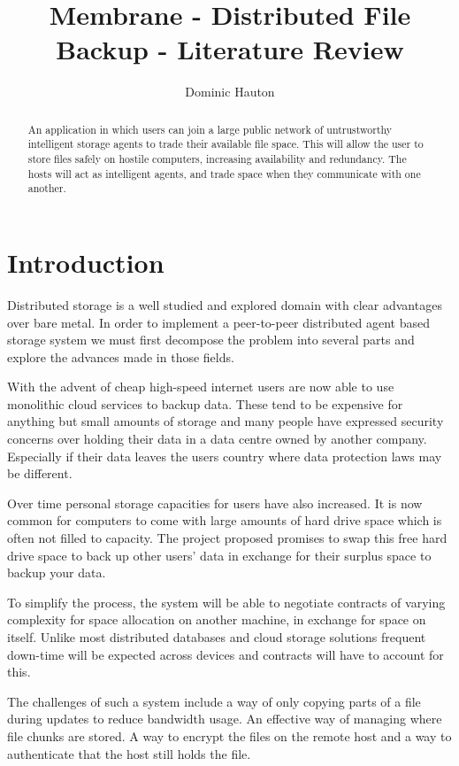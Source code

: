 \documentclass[a4paper,11pt, twocolumn]{report}
\title{Membrane - Distributed File Backup - Literature Review}
\author{Dominic Hauton}
\begin{document}
\maketitle

\begin{abstract}
An application in which users can join a large public network of untrustworthy intelligent storage agents to trade their available file space. This will allow the user to store files safely on hostile computers, increasing availability and redundancy. The hosts will act as intelligent agents, and trade space when they communicate with one another.
\end{abstract}

\section{Introduction}
Distributed storage is a well studied and explored domain with clear advantages over bare metal. In order to implement a peer-to-peer distributed agent based storage system we must first decompose the problem into several parts and explore the advances made in those fields.

With the advent of cheap high-speed internet users are now able to use monolithic cloud services to backup data. These tend to be expensive for anything but small amounts of storage and many people have expressed security concerns over holding their data in a data centre owned by another company. Especially if their data leaves the users country where data protection laws may be different.

Over time personal storage capacities for users have also increased. It is now common for computers to come with large amounts of hard drive space which is often not filled to capacity. The project proposed promises to swap this free hard drive space to back up other users’ data in exchange for their surplus space to backup your data.

To simplify the process, the system will be able to negotiate contracts of varying complexity for space allocation on another machine, in exchange for space on itself. Unlike most distributed databases and cloud storage solutions frequent down-time will be expected across devices and contracts will have to account for this.

The challenges of such a system include a way of only copying parts of a file during updates to reduce bandwidth usage. An effective way of managing where file chunks are stored. A way to encrypt the files on the remote host and a way to authenticate that the host still holds the file.
\end{document}
